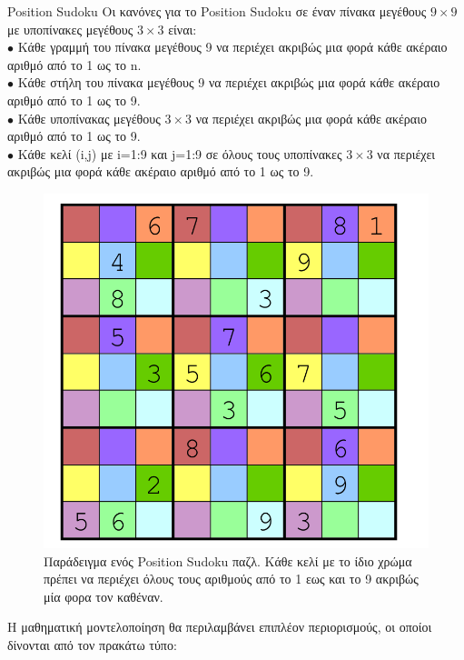\documentclass[oneside,12pt]{book}
\theoremstyle{definition}
\begin{document}
\begin{mytheorem}{Position Sudoku}{}
	Οι κανόνες για το Position Sudoku σε έναν πίνακα μεγέθους \(9 \times 9\) με υποπίνακες μεγέθους \(3 \times 3\) είναι: \\
	\(\bullet\) Κάθε γραμμή του πίνακα μεγέθους 9 να περιέχει ακριβώς μια φορά κάθε ακέραιο αριθμό από το 1 ως το n. \\
	\(\bullet\) Κάθε στήλη του πίνακα μεγέθους 9 να περιέχει ακριβώς μια φορά κάθε ακέραιο αριθμό από το 1 ως το 9. \\
	\(\bullet\) Κάθε υποπίνακας μεγέθους \(3 \times 3\) να περιέχει ακριβώς μια φορά κάθε ακέραιο αριθμό από το 1 ως το 9. \\
	\(\bullet\) Κάθε κελί (i,j) με i=1:9 και j=1:9 σε όλους τους υποπίνακες \(3 \times 3\) να περιέχει ακριβώς μια φορά κάθε ακέραιο αριθμό από το 1 ως το 9.
\end{mytheorem}

\begin{figure}[h]
	\centering
	\includegraphics[scale=0.4]{Figures/positionSUDOKU.png}
	\caption{Παράδειγμα ενός Position Sudoku παζλ. Κάθε κελί με το ίδιο χρώμα πρέπει να περιέχει όλους τους αριθμούς από το 1 εως και το 9 ακριβώς μία φορα τον καθέναν.}
\end{figure}

Η μαθηματική μοντελοποίηση θα περιλαμβάνει επιπλέον περιορισμούς, οι οποίοι δίνονται από τον πρακάτω τύπο:
\end{document}

